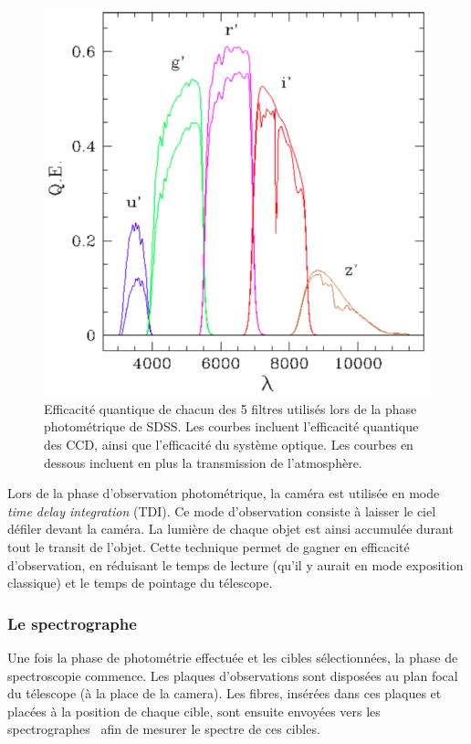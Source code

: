 \begin{figure}
  \centering
  \includegraphics[scale=0.4]{Filtres}
  \caption{Efficacité quantique de chacun des 5 filtres utilisés lors de la phase photométrique de SDSS. Les courbes incluent l'efficacité quantique des CCD, ainsi que l'efficacité du système optique. Les courbes en dessous incluent en plus la transmission de l'atmosphère.}
  \label{fig:Filtres}
\end{figure}

Lors de la phase d'observation photométrique, la caméra est utilisée en mode \emph{time delay integration} (TDI). Ce mode d'observation consiste à laisser le ciel défiler devant la caméra. La lumière de chaque objet est ainsi accumulée durant tout le transit de l'objet. Cette technique permet de gagner en efficacité d'observation, en réduisant le temps de lecture (qu'il y aurait en mode exposition classique) et le temps de pointage du télescope.


\subsubsection{Le spectrographe}
Une fois la phase de photométrie effectuée et les cibles sélectionnées, la phase de spectroscopie commence. Les plaques d'observations sont disposées au plan focal du télescope (à la place de la camera). Les fibres, insérées dans ces plaques et placées à la position de chaque cible, sont ensuite envoyées vers les spectrographes~\cite{Smee2012} afin de mesurer le spectre de ces cibles.

